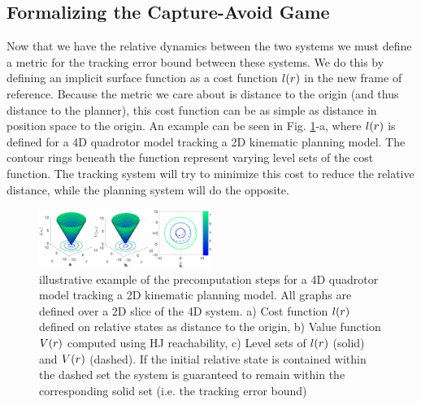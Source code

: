 \subsection{Formalizing the Capture-Avoid Game}
Now that we have the relative dynamics between the two systems we must define a metric for the tracking error bound between these systems. We do this by defining an implicit surface function as a cost function $l(r)$ in the new frame of reference. Because the metric we care about is distance to the origin (and thus distance to the planner), this cost function can be as simple as distance in position space to the origin. An example can be seen in Fig. \ref{fig:quad4D_example}-a, where $l(r)$ is defined for a 4D quadrotor model tracking a 2D kinematic planning model. The contour rings beneath the function represent varying level sets of the cost function. The tracking system will try to minimize this cost to reduce the relative distance, while the planning system will do the opposite.
\begin{figure}
	\centering
	\includegraphics[width=0.5\textwidth]{fig/quad4D_example}
	\caption{illustrative example of the precomputation steps for a 4D quadrotor model tracking a 2D kinematic planning model. All graphs are defined over a 2D slice of the 4D system. a) Cost function $l(r)$ defined on relative states as distance to the origin, b) Value function $V(r)$ computed using HJ reachability, c) Level sets of $l(r)$ (solid) and $V(r)$ (dashed). If the initial relative state is contained within the dashed set the system is guaranteed to remain within the corresponding solid set (i.e. the tracking error bound)}
	\label{fig:quad4D_example}
	\vspace{-.2in}
\end{figure} 

